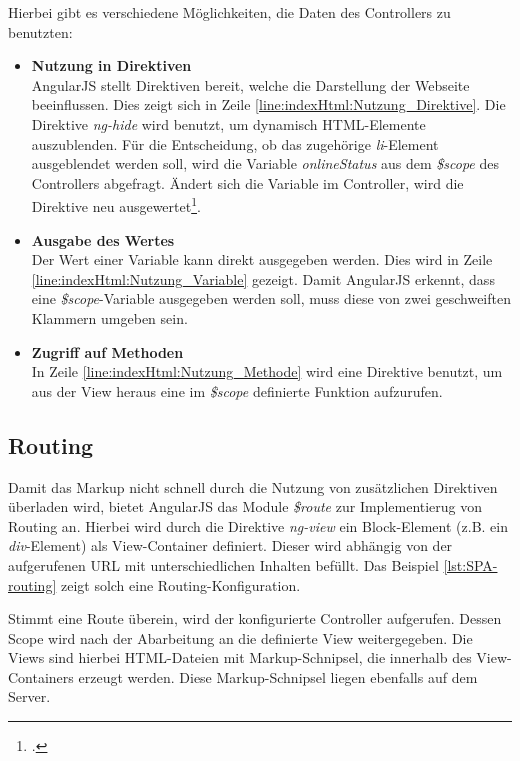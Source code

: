{Hierbei gibt es verschiedene Möglichkeiten, die Daten des Controllers zu benutzten: 
\begin{itemize}
\item \textbf{Nutzung in Direktiven}\\
AngularJS stellt Direktiven bereit, welche die Darstellung der Webseite beeinflussen. Dies zeigt sich in Zeile \ref{line:indexHtml:Nutzung_Direktive}. Die Direktive \textit{ng-hide} wird benutzt, um dynamisch \ac{HTML}-Elemente auszublenden. Für die Entscheidung, ob das zugehörige \textit{li}-Element ausgeblendet werden soll, wird die Variable \textit{onlineStatus} aus dem \textit{\$scope} des Controllers abgefragt. Ändert sich die Variable im Controller, wird die Direktive neu ausgewertet\footcite{online:angular:diretive}.
\item \textbf{Ausgabe des Wertes}\\
Der Wert einer Variable kann direkt ausgegeben werden. Dies wird in Zeile \ref{line:indexHtml:Nutzung_Variable} gezeigt. Damit AngularJS erkennt, dass eine \textit{\$scope}-Variable ausgegeben werden soll, muss diese von zwei geschweiften Klammern umgeben sein.
\item \textbf{Zugriff auf Methoden}\\
In Zeile \ref{line:indexHtml:Nutzung_Methode} wird eine Direktive benutzt, um aus der View heraus eine im \textit{\$scope} definierte Funktion aufzurufen.
\end{itemize}
\subsection{Routing}
\label{ssec:SPA-Routing}
Damit das Markup nicht schnell durch die Nutzung von zusätzlichen Direktiven überladen wird, bietet AngularJS das Module \textit{\$route} zur Implementierug von Routing an. Hierbei wird durch die Direktive \textit{ng-view} ein Block-Element (z.B. ein \textit{div}-Element) als View-Container definiert. Dieser wird abhängig von der aufgerufenen URL mit unterschiedlichen Inhalten befüllt. Das Beispiel \ref{lst:SPA-routing} zeigt solch eine Routing-Konfiguration. 

Stimmt eine Route überein, wird der konfigurierte Controller aufgerufen. Dessen Scope wird nach der Abarbeitung an die definierte View weitergegeben. Die Views sind hierbei \ac{HTML}-Dateien mit \gls{Markup}-Schnipsel, die innerhalb des View-Containers erzeugt werden. Diese \gls{Markup}-Schnipsel liegen ebenfalls auf dem Server. 
}
